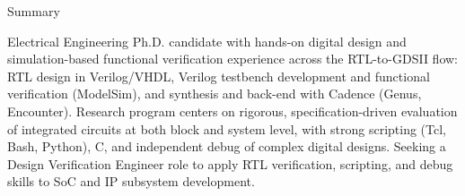\documentclass{resume} %
\begin{document}

\begin{rSection}{Summary}

Electrical Engineering Ph.D. candidate with hands-on digital design and simulation-based functional verification experience across the RTL-to-GDSII flow: RTL design in Verilog/VHDL, Verilog testbench development and functional verification (ModelSim), and synthesis and back-end with Cadence (Genus, Encounter). Research program centers on rigorous, specification-driven evaluation of integrated circuits at both block and system level, with strong scripting (Tcl, Bash, Python), C, and independent debug of complex digital designs. Seeking a Design Verification Engineer role to apply RTL verification, scripting, and debug skills to SoC and IP subsystem development.

\end{rSection}







\end{document}
